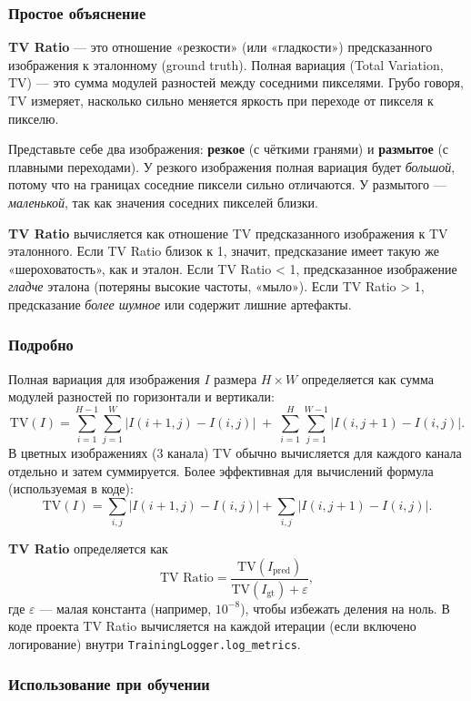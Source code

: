 \documentclass[12pt,a4paper]{article}
\begin{document}
\subsubsection{Простое объяснение}

\textbf{TV Ratio} — это отношение «резкости» (или «гладкости») предсказанного изображения к эталонному (ground truth). Полная вариация (Total Variation, TV) — это сумма модулей разностей между соседними пикселями. Грубо говоря, TV измеряет, насколько сильно меняется яркость при переходе от пикселя к пикселю.

Представьте себе два изображения: \textbf{резкое} (с чёткими гранями) и \textbf{размытое} (с плавными переходами). У резкого изображения полная вариация будет \textit{большой}, потому что на границах соседние пиксели сильно отличаются. У размытого — \textit{маленькой}, так как значения соседних пикселей близки.

\textbf{TV Ratio} вычисляется как отношение TV предсказанного изображения к TV эталонного. Если TV Ratio близок к 1, значит, предсказание имеет такую же «шероховатость», как и эталон. Если TV Ratio < 1, предсказанное изображение \textit{гладче} эталона (потеряны высокие частоты, «мыло»). Если TV Ratio > 1, предсказание \textit{более шумное} или содержит лишние артефакты.

\subsubsection{Подробно}

Полная вариация для изображения \(I\) размера \(H \times W\) определяется как сумма модулей разностей по горизонтали и вертикали:
\[
\text{TV}(I) = \sum_{i=1}^{H-1}\sum_{j=1}^{W} |I(i+1,j) - I(i,j)| \;+\; \sum_{i=1}^{H}\sum_{j=1}^{W-1} |I(i,j+1) - I(i,j)|.
\]
В цветных изображениях (3 канала) TV обычно вычисляется для каждого канала отдельно и затем суммируется. Более эффективная для вычислений формула (используемая в коде):
\[
\text{TV}(I) = \sum_{i,j} |I(i+1,j) - I(i,j)| + \sum_{i,j} |I(i,j+1) - I(i,j)|.
\]

\textbf{TV Ratio} определяется как
\[
\text{TV Ratio} = \frac{\text{TV}(I_{\text{pred}})}{\text{TV}(I_{\text{gt}}) + \varepsilon},
\]
где \(\varepsilon\) — малая константа (например, \(10^{-8}\)), чтобы избежать деления на ноль. В коде проекта TV Ratio вычисляется на каждой итерации (если включено логирование) внутри \texttt{TrainingLogger.log\_metrics}.

\subsubsection{Использование при обучении}
\end{document}
